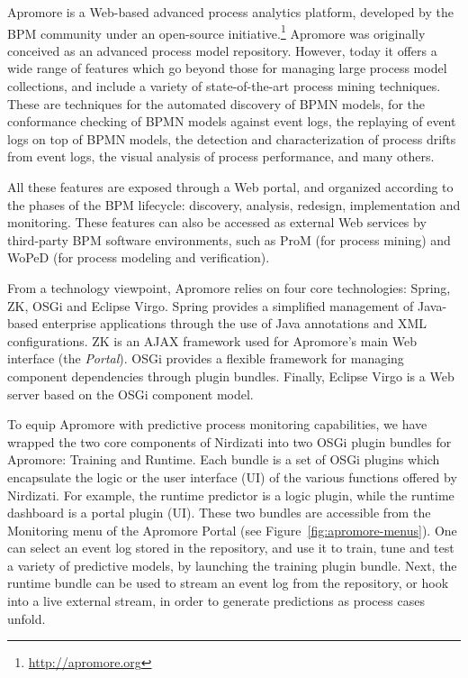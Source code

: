 Apromore is a Web-based advanced process analytics platform, developed by the BPM community under an open-source initiative.\footnote{\url{http://apromore.org}} Apromore was originally conceived as an advanced process model repository. However, today it offers a wide range of features which go beyond those for managing large process model collections, and include a variety of state-of-the-art process mining techniques. These are techniques for the automated discovery of BPMN models, for the conformance checking of BPMN models against event logs, the replaying of event logs on top of BPMN models, the detection and characterization of process drifts from event logs, the visual analysis of process performance, and many others. 

All these features are exposed through a Web portal, and organized according to the phases of the BPM lifecycle: discovery, analysis, redesign, implementation and monitoring. These features can also be accessed as external Web services by third-party BPM software environments, such as ProM (for process mining) and WoPeD (for process modeling and verification).

From a technology viewpoint, Apromore relies on four core technologies: Spring, ZK, OSGi and Eclipse Virgo. Spring provides a simplified management of Java-based enterprise applications through the use of Java annotations and XML configurations. ZK is an AJAX framework used for Apromore's main Web interface (the \emph{Portal}). OSGi provides a flexible framework for managing component dependencies through plugin bundles. Finally, Eclipse Virgo is a Web server based on the OSGi component model.

To equip Apromore with predictive process monitoring capabilities, we have wrapped the two core components of Nirdizati into two OSGi plugin bundles for Apromore: Training and Runtime. Each bundle is a set of OSGi plugins which encapsulate the logic or the user interface (UI) of the various functions offered by Nirdizati. For example, the runtime predictor is a logic plugin, while the runtime dashboard is a portal plugin (UI). These two bundles are accessible from the Monitoring menu of the Apromore Portal (see Figure~\ref{fig:apromore-menus}). One can select an event log stored in the repository, and use it to train, tune and test a variety of predictive models, by launching the training plugin bundle. Next, the runtime bundle can be used to stream an event log from the repository, or hook into a live external stream, in order to generate predictions as process cases unfold.    

